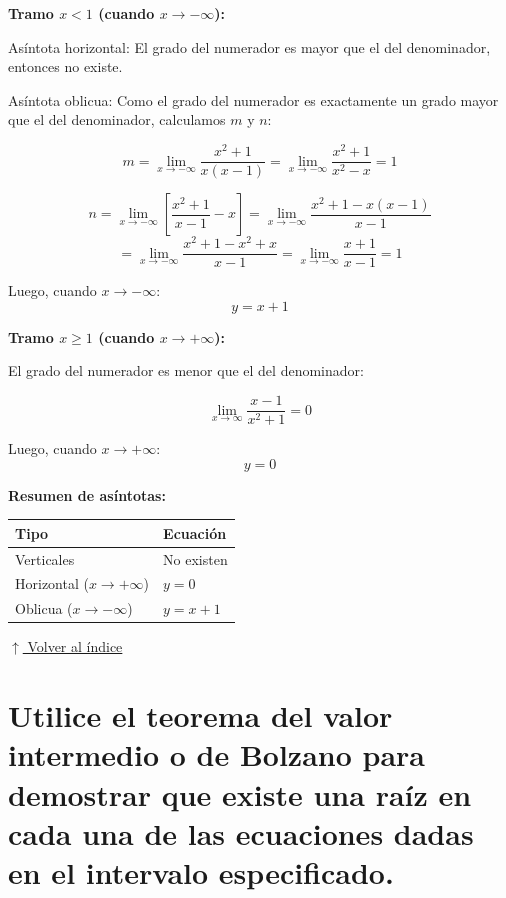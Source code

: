 \documentclass[12pt]{article}
\newcommand{\volverindice}{%
    \vspace{1em}%
    \begin{flushright}%
        \hyperlink{indice}{\small $\uparrow$ Volver al índice}%
    \end{flushright}%
}
\begin{document}
\begin{enumerate}[label=\alph*)]
    \textbf{Tramo $x < 1$ (cuando $x \to -\infty$):}

    Asíntota horizontal: El grado del numerador es mayor que el del denominador, entonces no existe.

    Asíntota oblicua: Como el grado del numerador es exactamente un grado mayor que el del denominador, calculamos $m$ y $n$:

    \[
    m = \lim_{x \to -\infty} \frac{x^2 + 1}{x(x - 1)} = \lim_{x \to -\infty} \frac{x^2 + 1}{x^2 - x} = 1
    \]

    \[
    n = \lim_{x \to -\infty} \left[\frac{x^2 + 1}{x - 1} - x\right] = \lim_{x \to -\infty} \frac{x^2 + 1 - x(x-1)}{x - 1}
    \]
    \[
    = \lim_{x \to -\infty} \frac{x^2 + 1 - x^2 + x}{x - 1} = \lim_{x \to -\infty} \frac{x + 1}{x - 1} = 1
    \]

    Luego, cuando $x \to -\infty$:
    \[
    \boxed{y = x + 1}
    \]

    \textbf{Tramo $x \geq 1$ (cuando $x \to +\infty$):}

    El grado del numerador es menor que el del denominador:

    \[
    \lim_{x \to \infty} \frac{x-1}{x^2+1} = 0
    \]

    Luego, cuando $x \to +\infty$:
    \[
    \boxed{y = 0}
    \]

    \vspace{0.5em}
    \textbf{Resumen de asíntotas:}

    \begin{center}
    \begin{tabular}{ll}
        \toprule
        Tipo & Ecuación \\
        \midrule
        Verticales & No existen \\
        Horizontal ($x \to +\infty$) & $y = 0$ \\
        Oblicua ($x \to -\infty$) & $y = x + 1$ \\
        \bottomrule
    \end{tabular}
    \end{center}

\end{enumerate}

\volverindice
\newpage

\section[Teorema del valor intermedio]{Utilice el teorema del valor intermedio o de Bolzano para demostrar que existe una raíz en cada una de las ecuaciones dadas en el intervalo especificado.}
\end{document}
